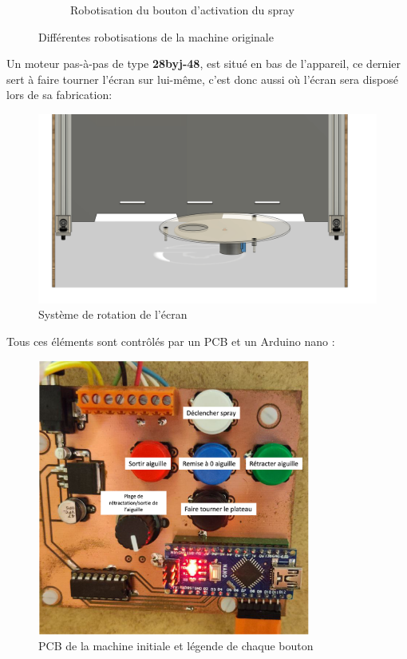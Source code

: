 \begin{figure}[H]
\begin{subfigure}{.65\textwidth}
    \caption{Robotisation du bouton d'activation du spray}
    \label{fig:robot_spray}
  \end{subfigure}
  \caption{Différentes robotisations de la machine originale}
  \label{fig:robotisations_aerographe}
\end{figure}

Un moteur pas-à-pas de type \textbf{28byj-48}, est situé en bas de l'appareil, ce dernier sert à faire tourner l'écran sur lui-même,
c'est donc aussi où l'écran sera disposé lors de sa fabrication:
\begin{figure}[H]
  \centering
  \includegraphics[width = \textwidth]{assets/figures/situation_initiale/rotation_ecran_initiale.png}
  \caption[Rotation écran initiale]{Système de rotation de l'écran}

\end{figure}

\newpage
Tous ces éléments sont contrôlés par un PCB et un Arduino nano :
\begin{figure}[H]
  \centering
  \includegraphics[width = 0.8\textwidth]{assets/figures/situation_initiale/PCB_machine_originale.png}
  \caption[PCB machine initiale]{PCB de la machine initiale et légende de chaque bouton}\label{PCB_machine_initial}
\end{figure}

